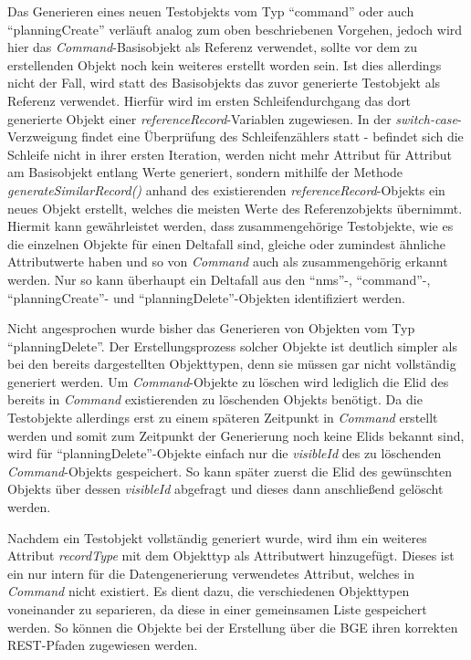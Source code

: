 Das Generieren eines neuen Testobjekts vom Typ \enquote{command} oder auch \enquote{planningCreate} verläuft analog zum oben beschriebenen Vorgehen, jedoch wird hier das \textit{Command}-Basisobjekt als Referenz verwendet, sollte vor dem zu erstellenden Objekt noch kein weiteres erstellt worden sein. Ist dies allerdings nicht der Fall, wird statt des Basisobjekts das zuvor generierte Testobjekt als Referenz verwendet. Hierfür wird im ersten Schleifendurchgang das dort generierte Objekt einer \textit{referenceRecord}-Variablen zugewiesen. In der \textit{switch-case}-Verzweigung findet eine Überprüfung des Schleifenzählers statt - befindet sich die Schleife nicht in ihrer ersten Iteration, werden nicht mehr Attribut für Attribut am Basisobjekt entlang Werte generiert, sondern mithilfe der Methode \textit{generateSimilarRecord()} anhand des existierenden \textit{referenceRecord}-Objekts ein neues Objekt erstellt, welches die meisten Werte des Referenzobjekts übernimmt. Hiermit kann gewährleistet werden, dass zusammengehörige Testobjekte, wie es die einzelnen Objekte für einen Deltafall sind, gleiche oder zumindest ähnliche Attributwerte haben und so von \textit{Command} auch als zusammengehörig erkannt werden. Nur so kann überhaupt ein Deltafall aus den \enquote{nms}-, \enquote{command}-, \enquote{planningCreate}- und \enquote{planningDelete}-Objekten identifiziert werden.

Nicht angesprochen wurde bisher das Generieren von Objekten vom Typ \enquote{planningDelete}. Der Erstellungsprozess solcher Objekte ist deutlich simpler als bei den bereits dargestellten Objekttypen, denn sie müssen gar nicht vollständig generiert werden. Um \textit{Command}-Objekte zu löschen wird lediglich die \ac{Elid} des bereits in \textit{Command} existierenden zu löschenden Objekts benötigt. Da die Testobjekte allerdings erst zu einem späteren Zeitpunkt in \textit{Command} erstellt werden und somit zum Zeitpunkt der Generierung noch keine \ac{Elid}s bekannt sind, wird für \enquote{planningDelete}-Objekte einfach nur die \textit{visibleId} des zu löschenden \textit{Command}-Objekts gespeichert. So kann später zuerst die \ac{Elid} des gewünschten Objekts über dessen \textit{visibleId} abgefragt und dieses dann anschließend gelöscht werden.

Nachdem ein Testobjekt vollständig generiert wurde, wird ihm ein weiteres Attribut \textit{recordType} mit dem Objekttyp als Attributwert hinzugefügt. Dieses ist ein nur intern für die Datengenerierung verwendetes Attribut, welches in \textit{Command} nicht existiert. Es dient dazu, die verschiedenen Objekttypen voneinander zu separieren, da diese in einer gemeinsamen Liste gespeichert werden. So können die Objekte bei der Erstellung über die \ac{BGE} ihren korrekten \ac{REST}-Pfaden zugewiesen werden. 

